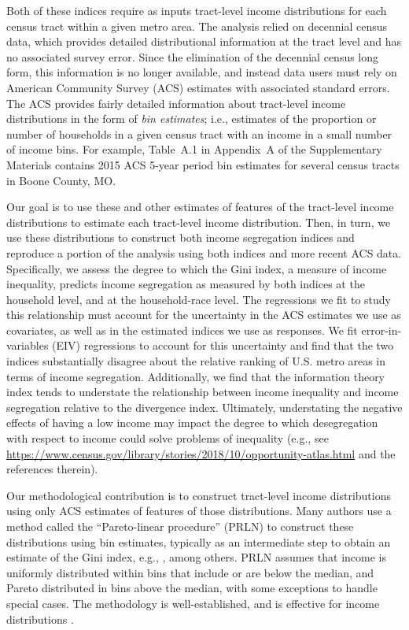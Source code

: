 \documentclass[12pt]{article}
\begin{document}
Both of these indices require as inputs tract-level income distributions for each census tract within a given metro area. The \citet{reardon2011income} analysis relied on decennial census data, which provides detailed distributional information at the tract level and has no associated survey error. Since the elimination of the decennial census long form, this information is no longer available, and instead data users must rely on American Community Survey (ACS) estimates with associated standard errors. The ACS provides fairly detailed information about tract-level income distributions in the form of \emph{bin estimates}; i.e., estimates of the proportion or number of households in a given census tract with an income in a small number of income bins. For example, Table~A.1 %
 in Appendix~A %
 of the Supplementary Materials contains 2015 ACS 5-year period bin estimates for several census tracts in Boone County, MO.

Our goal is to use these and other estimates of features of the tract-level income distributions to estimate each tract-level income distribution. Then, in turn, we use these distributions to construct both income segregation indices and reproduce a portion of the \citet{reardon2011income} analysis using both indices and more recent ACS data. Specifically, we assess the degree to which the Gini index, a measure of income inequality, predicts income segregation as measured by both indices at the household level, and at the household-race level. The regressions we fit to study this relationship must account for the uncertainty in the ACS estimates we use as covariates, as well as in the estimated indices we use as responses. We fit error-in-variables (EIV) regressions to account for this uncertainty and find that the two indices substantially disagree about the relative ranking of U.S. metro areas in terms of income segregation. Additionally, we find that the information theory index tends to understate the relationship between income inequality and income segregation relative to the divergence index. Ultimately, understating the negative effects of having a low income may impact the degree to which desegregation with respect to income could solve problems of inequality (e.g., see \url{https://www.census.gov/library/stories/2018/10/opportunity-atlas.html} and the references therein).  


Our methodological contribution is to construct tract-level income distributions using only ACS estimates of features of those distributions. Many authors use a method called the ``Pareto-linear procedure'' (PRLN) to construct these distributions using bin estimates, typically as an intermediate step to obtain an estimate of the Gini index, e.g., \citet{jargowsky1996take,nielsen1997kuznets,hipp2007block,hipp2007income,moller2009changing,hipp2013extrapolative,braithwaite2015sexual}, among others. PRLN assumes that income is uniformly distributed within bins that include or are below the median, and Pareto distributed in bins above the median, with some exceptions to handle special cases. The methodology is well-established, and is effective for income distributions \citep{miller1966income,aigner1970estimation,kakwani1976efficient,spiers1977prln,henson1980money,welniak1988calculating}. 
\end{document}
